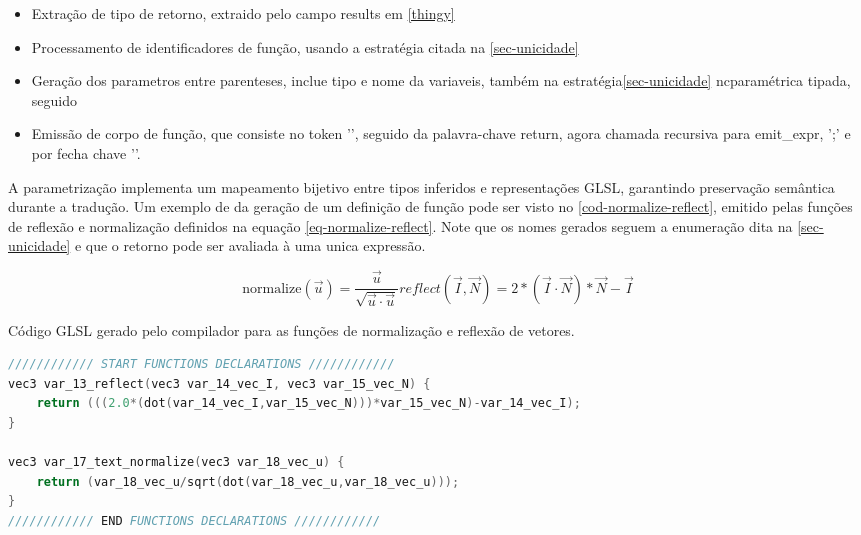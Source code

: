 \begin{itemize}
   \item Extração de tipo de retorno, extraido pelo campo results em \autoref{thingy}
   \item Processamento de identificadores de função, usando a estratégia citada na \autoref{sec-unicidade}
   \item Geração dos parametros entre parenteses, inclue tipo e nome da variaveis, também na estratégia\autoref{sec-unicidade}  ncparamétrica tipada, seguido
   \item Emissão de corpo de função, que consiste no token '{', seguido da palavra-chave return, agora chamada recursiva para emit_expr, ';' e por fecha chave '}'.
\end{itemize}

A parametrização implementa um mapeamento bijetivo entre tipos inferidos e representações GLSL, garantindo preservação semântica durante a tradução.
Um exemplo de da geração de um definição de função pode ser visto no \autoref{cod-normalize-reflect}, emitido pelas funções de reflexão e normalização definidos na equação \autoref{eq-normalize-reflect}. Note que os nomes gerados seguem a enumeração dita na \autoref{sec-unicidade} e que o retorno pode ser avaliada à uma unica expressão.


\label{eq-normalize-reflect} \begin{subequations}
\begin{equation}
  \text{normalize}(\vec{u}) = \frac{\vec{u}}{\sqrt{\vec{u} \cdot \vec{u}}}
\end{equation}

\begin{equation}
reflect(\vec I, \vec N) =  2*(\vec I \cdot \vec N)*\vec N - \vec I
\end{equation}
\end{subequations}

\begin{codigo}[htb]
   \caption{\small Código GLSL gerado pelo compilador para as funções de normalização e reflexão de vetores. }
   \label{cod-normalize-reflect}
\begin{lstlisting}[language=C, inputencoding=utf8]
//////////// START FUNCTIONS DECLARATIONS ////////////
vec3 var_13_reflect(vec3 var_14_vec_I, vec3 var_15_vec_N) {
    return (((2.0*(dot(var_14_vec_I,var_15_vec_N)))*var_15_vec_N)-var_14_vec_I);
}

vec3 var_17_text_normalize(vec3 var_18_vec_u) {
    return (var_18_vec_u/sqrt(dot(var_18_vec_u,var_18_vec_u)));
}
//////////// END FUNCTIONS DECLARATIONS ////////////

\end{lstlisting}
\end{codigo}
